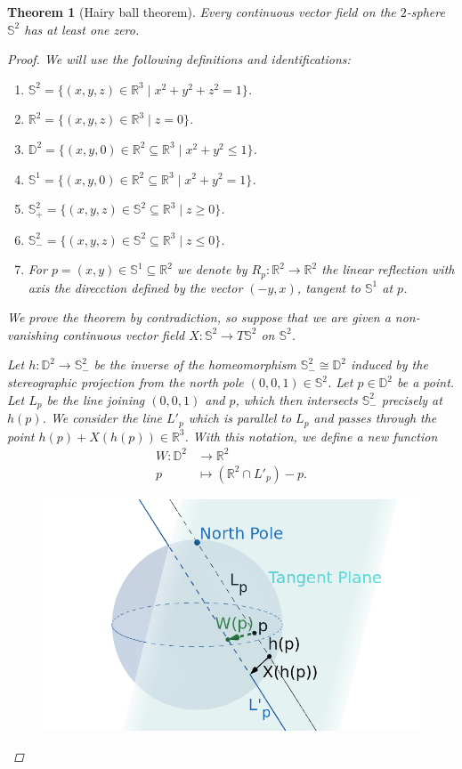 \documentclass[A4paper, 12pt, british, reqno]{amsart}
\newcommand{\bbD}{\mathbb{D}}
\newcommand{\R}{\mathbb{R}} %
\newcommand{\bbS}{\mathbb{S}}
\theoremstyle{plain}
\newtheorem{thm}{Theorem}[section]
\theoremstyle{definition}
\theoremstyle{remark}
\theoremstyle{plain}
\theoremstyle{definition}
\theoremstyle{remark}
\theoremstyle{plain}
\theoremstyle{definition}
\theoremstyle{remark}
\begin{document}
\begin{thm}[Hairy ball theorem]
    Every continuous vector field on the $2$-sphere $\bbS^{2}$ has at least one zero.
    \begin{proof}
	We will use the following definitions and identifications:
	\begin{enumerate}[label=\textbullet]
	    \item $\bbS^{2}=\{ (x,y,z)\in \R^{3}\mid x^{2}+y^{2}+z^{2}=1 \}$.
	    \item $\R^{2}=\{ (x,y,z)\in \R^{3}\mid z=0 \}$.
	    \item $\bbD^{2}=\{ (x,y,0)\in \R^{2}\subseteq \R^{3}\mid x^{2}+y^{2}\leqslant 1 \}$.
	    \item $\bbS^{1}=\{ (x,y,0)\in \R^{2}\subseteq \R^{3}\mid x^{2}+y^{2}=1\}$.
	    \item $\bbS^{2}_{+}=\{ (x,y,z)\in \bbS^{2}\subseteq \R^{3}\mid z\geqslant 0 \}$.
	    \item $\bbS^{2}_{-}=\{ (x,y,z)\in \bbS^{2}\subseteq \R^{3}\mid z\leqslant 0 \}$.
	    \item For $p=(x,y)\in \bbS^{1}\subseteq \R^{2}$ we denote by $R_{p}\colon \R^{2}\to \R^{2}$ the linear reflection with axis the direcction defined by the vector $(-y,x)$, tangent to $\bbS^{1}$ at $p$.
	\end{enumerate}

	We prove the theorem by contradiction, so suppose that we are given a non-vanishing continuous vector field $X\colon \bbS^{2}\to T\bbS^{2}$ on $\bbS^{2}$.

	Let $h\colon \bbD^{2}\to \bbS^{2}_{-}$ be the inverse of the homeomorphism $\bbS^{2}_{-}\cong\bbD^{2}$ induced by the stereographic projection from the north pole $(0,0,1)\in \bbS^{2}$.
	Let $p\in \bbD^{2}$ be a point.
	Let $L_{p}$ be the line joining $(0,0,1)$ and $p$, which then intersects $\bbS^{2}_{-}$ precisely at $h(p)$.
	We consider the line $L'_{p}$ which is parallel to $L_{p}$ and passes through the point $h(p)+X(h(p))\in \R^{3}$.
	With this notation, we define a new function
	\begin{align*}
	    W\colon \bbD^{2} &\longrightarrow \R^{2} \\
	    p & \longmapsto (\R^{2}\cap L'_{p})-p.
	\end{align*}

	\begin{figure}[htp]
	    \centering
	    \includegraphics[scale=.4]{HairyBallW.png}
	\end{figure}


\end{proof}
\end{thm}
\end{document}
